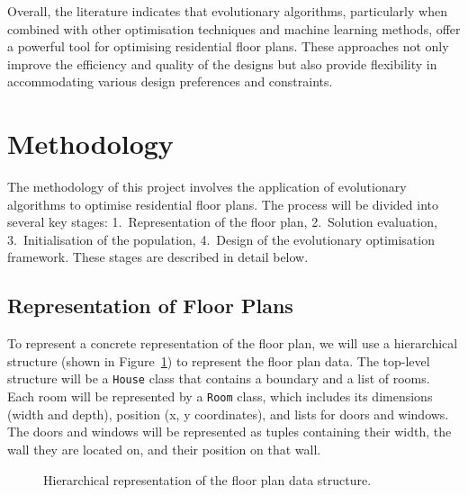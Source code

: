 \documentclass[]{article}
\begin{document}
Overall, the literature indicates that evolutionary algorithms, particularly when combined with other optimisation techniques and machine learning methods, offer a powerful tool for optimising residential floor plans. These approaches not only improve the efficiency and quality of the designs but also provide flexibility in accommodating various design preferences and constraints.

\section{Methodology}
The methodology of this project involves the application of evolutionary algorithms to optimise residential floor plans. The process will be divided into several key stages: 1.\ Representation of the floor plan, 2.\ Solution evaluation, 3.\ Initialisation of the population, 4.\ Design of the evolutionary optimisation framework. These stages are described in detail below.

\subsection{Representation of Floor Plans}
To represent a concrete representation of the floor plan, we will use a hierarchical structure (shown in Figure~\ref{fig:representation_hierarchy}) to represent the floor plan data. The top-level structure will be a \texttt{House} class that contains a boundary and a list of rooms. Each room will be represented by a \texttt{Room} class, which includes its dimensions (width and depth), position (x, y coordinates), and lists for doors and windows. The doors and windows will be represented as tuples containing their width, the wall they are located on, and their position on that wall.
\begin{figure}[h]
    \centering
    \caption{Hierarchical representation of the floor plan data structure.}
    \label{fig:representation_hierarchy}
\end{figure}
\end{document}

